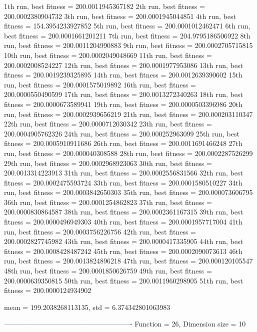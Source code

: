 1th run, best fitness = 200.0011945367182
2th run, best fitness = 200.0002380904732
3th run, best fitness = 200.0001945044851
4th run, best fitness = 154.3954233927852
5th run, best fitness = 200.0001012462471
6th run, best fitness = 200.0001661201211
7th run, best fitness = 204.9795186506922
8th run, best fitness = 200.0011204990883
9th run, best fitness = 200.0002705715815
10th run, best fitness = 200.0002049048669
11th run, best fitness = 200.0002008524227
12th run, best fitness = 200.0001977953086
13th run, best fitness = 200.0019239325895
14th run, best fitness = 200.0012639390602
15th run, best fitness = 200.0001575019892
16th run, best fitness = 200.0000550490599
17th run, best fitness = 200.0013272340263
18th run, best fitness = 200.0000673589941
19th run, best fitness = 200.0000503396986
20th run, best fitness = 200.0002939656219
21th run, best fitness = 200.000203110347
22th run, best fitness = 200.0000712030342
23th run, best fitness = 200.0004905762326
24th run, best fitness = 200.000252963099
25th run, best fitness = 200.0005910911686
26th run, best fitness = 200.0011691466248
27th run, best fitness = 200.000040308588
28th run, best fitness = 200.0002287526299
29th run, best fitness = 200.0002968923063
30th run, best fitness = 200.0013314223913
31th run, best fitness = 200.0002556831566
32th run, best fitness = 200.0002475593724
33th run, best fitness = 200.0001580510227
34th run, best fitness = 200.0003842650303
35th run, best fitness = 200.000073606795
36th run, best fitness = 200.0001254862823
37th run, best fitness = 200.0000830864587
38th run, best fitness = 200.0002361167315
39th run, best fitness = 200.0000496949303
40th run, best fitness = 200.0001957717004
41th run, best fitness = 200.0003756226756
42th run, best fitness = 200.0002827745982
43th run, best fitness = 200.0000417335905
44th run, best fitness = 200.0008428487242
45th run, best fitness = 200.0002090073613
46th run, best fitness = 200.0013824896218
47th run, best fitness = 200.000120105547
48th run, best fitness = 200.0001850626759
49th run, best fitness = 200.0000639350815
50th run, best fitness = 200.0011960298905
51th run, best fitness = 200.0000124934902

mean = 199.2038268113135, std = 6.374342801063983

-------------------------------------------------------
Function = 26, Dimension size = 10

